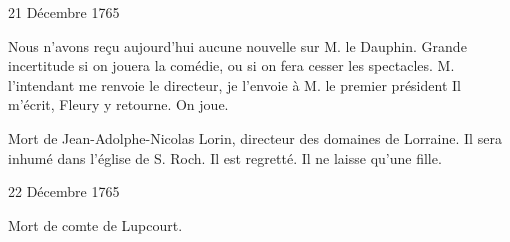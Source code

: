                      \begin{diary}{21 Décembre 1765}{}

                         Nous n'avons reçu aujourd'hui aucune nouvelle
                           sur M. le Dauphin.
                           Grande incertitude si on
                           jouera la comédie, ou si on fera cesser les
                           spectacles. M. l'intendant
                           me renvoie le
                              directeur, je l'envoie à M. le premier président
                           Il m'écrit, Fleury y retourne.
                           On joue. \bigskip


                         Mort de Jean-Adolphe-Nicolas Lorin,
                           directeur
                           des domaines de Lorraine. Il sera
                           inhumé dans l’église de S.
                              Roch. Il est
                           regretté. Il ne laisse qu'une fille. \bigskip


                     \end{diary}

                     \begin{diary}{22 Décembre 1765}{}

                         Mort de
                           comte de Lupcourt. \bigskip


                     \end{diary}

